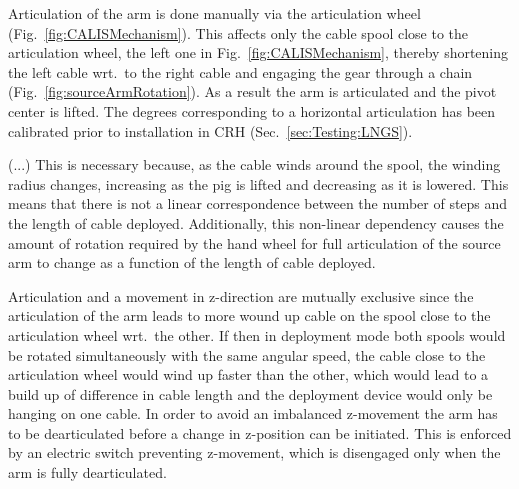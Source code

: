 Articulation of the arm is done manually via the articulation wheel (Fig.~\ref{fig:CALISMechanism}). This affects only the cable spool close to the articulation wheel, the left one in Fig.~\ref{fig:CALISMechanism}, thereby shortening the left cable wrt.~to the right cable and engaging the gear through a chain (Fig.~\ref{fig:sourceArmRotation}). As a result the arm is articulated and the pivot center is lifted. The degrees corresponding to a horizontal articulation has been calibrated prior to installation in CRH (Sec.~\ref{sec:Testing:LNGS}).


(...) This is necessary because, as the cable winds around the spool, the winding radius changes, increasing as the pig is lifted and decreasing as it is lowered.  This means that there is not a linear correspondence between the number of steps and the length of cable deployed.  Additionally, this non-linear dependency causes the amount of rotation required by the hand wheel for full articulation of the source arm to change as a function of the length of cable deployed.     


Articulation and a movement in z-direction are mutually exclusive since the articulation of the arm leads to more wound up cable on the spool close to the articulation wheel wrt.~the other. If then in deployment mode both spools would be rotated simultaneously with the same angular speed, the cable close to the articulation wheel would wind up faster than the other, which would lead to a build up of difference in cable length and the deployment device would only be hanging on one cable. In order to avoid an imbalanced z-movement the arm has to be dearticulated before a change in z-position can be initiated. This is enforced by an electric switch preventing z-movement, which is disengaged only when the arm is fully dearticulated. 

